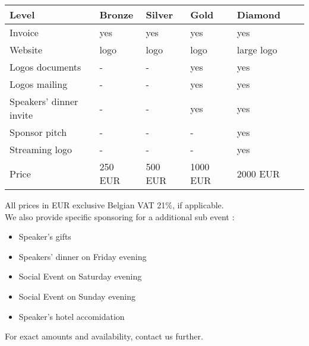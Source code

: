 \begin{longtable}{|p{40mm}|p{20mm}|p{20mm}|p{20mm}|p{20mm}|p{20mm}|p{20mm}|}
\hline
Level                   &   Bronze              &   Silver              &   Gold                &   Diamond             \\
\hline
Invoice                 &   yes                 &   yes                 &   yes                 &   yes                 \\
\hline
Website                 &   logo                &   logo                &   logo                &   large logo          \\
\hline
Logos documents         &   -                   &   -                   &   yes                 &   yes                 \\
\hline
Logos mailing           &   -                   &   -                   &   yes                 &   yes                 \\
\hline
Speakers' dinner invite &   -                   &   -                   &   yes                 &   yes                 \\
\hline
Sponsor pitch           &   -                   &   -                   &   -                   &   yes                 \\
\hline
Streaming logo          &   -                   &   -                   &   -                   &   yes                 \\
\hline
Price                   &   250 EUR             &   500 EUR             &   1000 EUR            &   2000 EUR            \\
\hline
\end{longtable}
All prices in EUR exclusive Belgian VAT 21\%, if applicable.\\

We also provide specific sponsoring for a additional sub event :
\begin{itemize}
    \item
        Speaker's gifts
    \item
        Speakers' dinner on Friday evening
    \item
        Social Event on Saturday evening
    \item
        Social Event on Sunday evening
    \item
        Speaker's hotel accomidation
\end{itemize}
For exact amounts and availability, contact us further.
